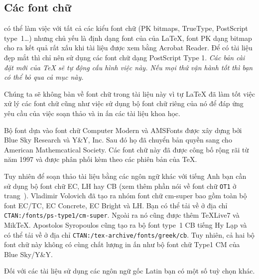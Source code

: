 \subsection{Các font chữ}
 có thể làm việc với tất cả các kiểu font chữ (PK bitmaps, TrueType, PostScript type~1\dots) nhưng chủ yếu là định dạng font của của \LaTeX{}, font PK dạng bitmap cho ra kết quả rất xấu khi tài liệu được xem bằng Acrobat Reader. Để có tài liệu đẹp mắt thì chỉ nên sử dụng các font chữ dạng PostScript Type 1. \emph{Các bản cài đặt mới của \TeX{} sẽ tự động cấu hình việc này. Nếu mọi thứ vận hành tốt thì bạn có thể bỏ qua cả mục này.}

Chúng ta sẽ không bàn về font chữ trong tài liệu này vì tự \LaTeX{} đã làm tốt việc xử lý các font chữ cũng như việc sử dụng
bộ font chữ riêng của nó để đáp ứng yêu cầu của việc soạn thảo và in ấn các tài liệu khoa học.

Bộ font \PSi{} dựa vào font chữ Computer Modern và AMSFonts được xây dựng bởi Blue Sky Research và Y\&Y, Inc. Sau đó họ đã chuyển bản quyền sang cho American Mathemcatical Society. Các font chữ này đã được công bố rộng rãi từ năm 1997 và được phân phối kèm theo các phiên bản của \TeX{}.

Tuy nhiên để soạn thảo tài liệu bằng các ngôn ngữ khác với tiếng Anh bạn cần sử dụng bộ font chữ EC, LH hay CB (xem thêm phần nói về font chữ \texttt{OT1} ở trang~\pageref{OT1}). Vladimir Volovich đã tạo ra nhóm font chữ cm-super bao gồm toàn bộ font EC/TC, EC Concrete, EC Bright và LH. Bạn có thể tải về ở địa chỉ \texttt{CTAN:/fonts/ps-type1/cm-super}. Ngoài ra nó cũng được thêm \TeX{}Live7 và Mik\TeX. Apostolos Syropoulos cũng tạo ra bộ font type~1 CB tiếng Hy Lạp và có thể tải về ở địa chỉ \texttt{CTAN:/tex-archive/fonts/greek/cb}. Tuy nhiên, cả hai bộ font chữ này không có cùng chất lượng in ấn như bộ font chữ Type1 CM của Blue Sky/Y\&Y.

Đối với các tài liệu sử dụng các ngôn ngữ gốc Latin bạn có một số tuỳ chọn khác.

